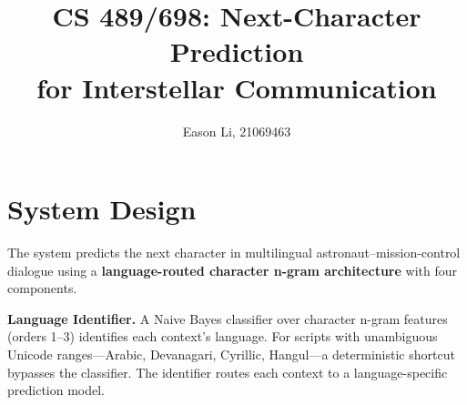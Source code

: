 \documentclass[11pt]{article}
\title{\vspace{-1.5em}CS 489/698: Next-Character Prediction \\ for Interstellar Communication\vspace{-0.5em}}
\author{Eason Li, 21069463}
\date{}
\begin{document}
\maketitle
\vspace{-2em}

\section{System Design}

The system predicts the next character in multilingual astronaut--mission-control dialogue using a \textbf{language-routed character n-gram architecture} with four components.

\textbf{Language Identifier.}
A Naive Bayes classifier over character n-gram features (orders 1--3) identifies each context's language. For scripts with unambiguous Unicode ranges---Arabic, Devanagari, Cyrillic, Hangul---a deterministic shortcut bypasses the classifier. The identifier routes each context to a language-specific prediction model.
\end{document}
